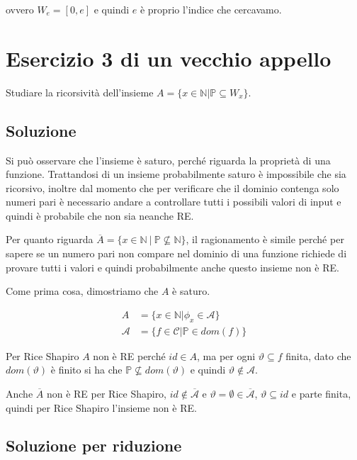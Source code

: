 ovvero $W_e = [0,e]$ e quindi $e$ è proprio l'indice che cercavamo.

\section{Esercizio 3 di un vecchio appello}
 
 Studiare la ricorsività dell'insieme $A = \{ x \in \mathbb{N} | \mathbb{P} \subseteq W_x \}$.
 
 \subsection{Soluzione}
 
 Si può osservare che l'insieme è saturo, perché riguarda la proprietà di una funzione. Trattandosi di un insieme probabilmente saturo è impossibile che sia ricorsivo, inoltre dal momento che per verificare che il dominio contenga solo numeri pari è necessario andare a controllare tutti i possibili valori di input e quindi è probabile che non sia neanche RE.
 
 Per quanto riguarda $\overline{A} = \{ x \in \mathbb{N} \: | \: \mathbb{P} \nsubseteq \mathbb{N}\}$, il ragionamento è simile perché per sapere se un numero pari non compare nel dominio di una funzione richiede di provare tutti i valori e quindi probabilmente anche questo insieme non è RE.
 
 Come prima cosa, dimostriamo che $A$ è saturo.
 
\begin{align*}
 A &= \{ x \in \mathbb{N} | \phi_x \in \mathcal{A}\} \\
 \mathcal{A} &= \{ f \in \mathcal{C} | \mathbb{P} \in dom(f) \}
\end{align*}

Per Rice Shapiro $A$ non è RE perché $id \in A$, ma per ogni $\vartheta \subseteq f$ finita, dato che $dom(\vartheta)$ è finito si ha che $\mathbb{P} \nsubseteq dom(\vartheta)$ e quindi $\vartheta \notin \mathcal{A}$.

Anche $\overline{A}$ non è RE per Rice Shapiro, $id \notin \overline{\mathcal{A}}$ e $\vartheta = \emptyset \in  \overline{\mathcal{A}}$, $\vartheta \subseteq id$ e parte finita, quindi per Rice Shapiro l'insieme non è RE.

\subsection{Soluzione per riduzione}

